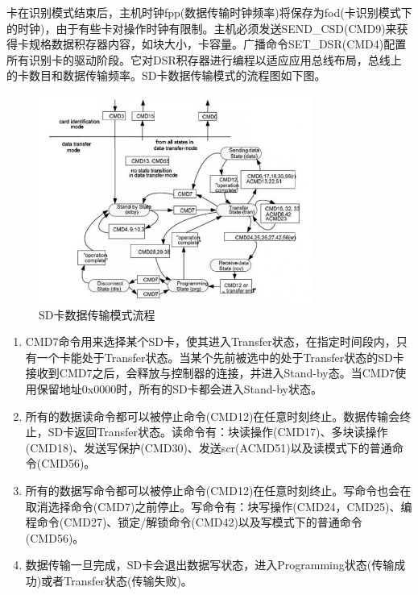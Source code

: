 卡在识别模式结束后，主机时钟fpp(数据传输时钟频率)将保存为fod(卡识别模式下的时钟)，由于有些卡对操作时钟有限制。主机必须发送SEND\_CSD(CMD9)来获得卡规格数据积存器内容，如块大小，卡容量。广播命令SET\_DSR(CMD4)配置所有识别卡的驱动阶段。它对DSR积存器进行编程以适应应用总线布局，总线上的卡数目和数据传输频率。SD卡数据传输模式的流程图如下图。
\begin{figure}[H]
    \centering
    \includegraphics[width=0.8\textwidth]{figures/06-02-数据传输.png}
    \caption{SD卡数据传输模式流程}
\end{figure}

\begin{enumerate}
	\item CMD7命令用来选择某个SD卡，使其进入Transfer状态，在指定时间段内，只有一个卡能处于Transfer状态。当某个先前被选中的处于Transfer状态的SD卡接收到CMD7之后，会释放与控制器的连接，并进入Stand-by态。当CMD7使用保留地址0x0000时，所有的SD卡都会进入Stand-by状态。
	\item 所有的数据读命令都可以被停止命令(CMD12)在任意时刻终止。数据传输会终止，SD卡返回Transfer状态。读命令有：块读操作(CMD17)、多块读操作(CMD18)、发送写保护(CMD30)、发送scr(ACMD51)以及读模式下的普通命令(CMD56)。
	\item 所有的数据写命令都可以被停止命令(CMD12)在任意时刻终止。写命令也会在取消选择命令(CMD7)之前停止。写命令有：块写操作(CMD24，CMD25)、编程命令(CMD27)、锁定/解锁命令(CMD42)以及写模式下的普通命令(CMD56)。
	\item 数据传输一旦完成，SD卡会退出数据写状态，进入Programming状态(传输成功)或者Transfer状态(传输失败)。
\end{enumerate}
\clearpage